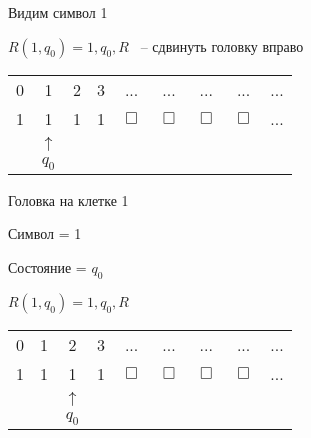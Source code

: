 \documentclass[russian]{lecture-notes}
\begin{document}
\begin{example}
        Видим символ 1

        $R(1, q_0) = 1, q_0, R$ ~-- сдвинуть головку вправо

        \begin{table}[H]

            \centering
            \begin{tabular}{ *{9}{c} }
                \cline{1-9}
                \multicolumn{1}{|c}{0} &
                \multicolumn{1}{|c}{1} &
                \multicolumn{1}{|c}{2} &
                \multicolumn{1}{|c}{3} &
                \multicolumn{1}{|c}{...} &
                \multicolumn{1}{|c}{...} &
                \multicolumn{1}{|c}{...} &
                \multicolumn{1}{|c}{...} &
                \multicolumn{1}{|c|}{...} \\
                \cline{1-9}
                \cline{1-9}
                \multicolumn{1}{|c}{1} &
                \multicolumn{1}{|c}{1} &
                \multicolumn{1}{|c}{1} &
                \multicolumn{1}{|c}{1} &
                \multicolumn{1}{|c}{$\Box$} &
                \multicolumn{1}{|c}{$\Box$} &
                \multicolumn{1}{|c}{$\Box$} &
                \multicolumn{1}{|c}{$\Box$} &
                \multicolumn{1}{|c|}{...} \\
                \cline{1-9}
                & $\uparrow$ \\
                & $q_0$
            \end{tabular}
        \end{table}

        Головка на клетке 1

        Символ = 1

        Состояние = $q_0$

        $R(1, q_0) = 1, q_0, R$

        \begin{table}[H]

            \centering
            \begin{tabular}{ *{9}{c} }
                \cline{1-9}
                \multicolumn{1}{|c}{0} &
                \multicolumn{1}{|c}{1} &
                \multicolumn{1}{|c}{2} &
                \multicolumn{1}{|c}{3} &
                \multicolumn{1}{|c}{...} &
                \multicolumn{1}{|c}{...} &
                \multicolumn{1}{|c}{...} &
                \multicolumn{1}{|c}{...} &
                \multicolumn{1}{|c|}{...} \\
                \cline{1-9}
                \cline{1-9}
                \multicolumn{1}{|c}{1} &
                \multicolumn{1}{|c}{1} &
                \multicolumn{1}{|c}{1} &
                \multicolumn{1}{|c}{1} &
                \multicolumn{1}{|c}{$\Box$} &
                \multicolumn{1}{|c}{$\Box$} &
                \multicolumn{1}{|c}{$\Box$} &
                \multicolumn{1}{|c}{$\Box$} &
                \multicolumn{1}{|c|}{...} \\
                \cline{1-9}
                & & $\uparrow$ \\
                & & $q_0$
            \end{tabular}
        \end{table}


\end{example}
\end{document}
